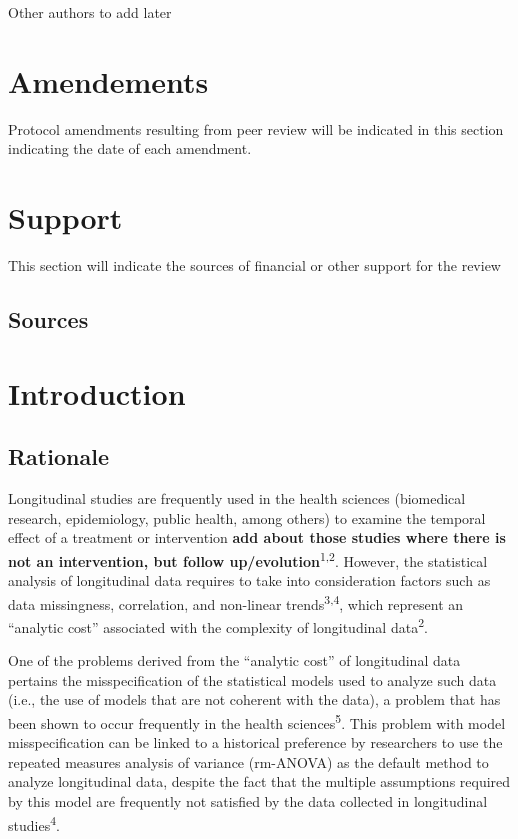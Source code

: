 \documentclass[
]{article}
\begin{document}
Other authors to add later

\hypertarget{amendements}{%
\section{Amendements}\label{amendements}}

Protocol amendments resulting from peer review will be indicated in this
section indicating the date of each amendment.

\hypertarget{support}{%
\section{Support}\label{support}}

This section will indicate the sources of financial or other support for
the review

\hypertarget{sources}{%
\subsection{Sources}\label{sources}}

\hypertarget{introduction}{%
\section{Introduction}\label{introduction}}

\hypertarget{rationale}{%
\subsection{Rationale}\label{rationale}}

Longitudinal studies are frequently used in the health sciences
(biomedical research, epidemiology, public health, among others) to
examine the temporal effect of a treatment or intervention \textbf{add
about those studies where there is not an intervention, but follow
up/evolution}\textsuperscript{1,2}. However, the statistical analysis of
longitudinal data requires to take into consideration factors such as
data missingness, correlation, and non-linear
trends\textsuperscript{3,4}, which represent an ``analytic cost''
associated with the complexity of longitudinal data\textsuperscript{2}.

One of the problems derived from the ``analytic cost'' of longitudinal
data pertains the misspecification of the statistical models used to
analyze such data (i.e., the use of models that are not coherent with
the data), a problem that has been shown to occur frequently in the
health sciences\textsuperscript{5}. This problem with model
misspecification can be linked to a historical preference by researchers
to use the repeated measures analysis of variance (rm-ANOVA) as the
default method to analyze longitudinal data, despite the fact that the
multiple assumptions required by this model are frequently not satisfied
by the data collected in longitudinal studies\textsuperscript{4}.
\end{document}
